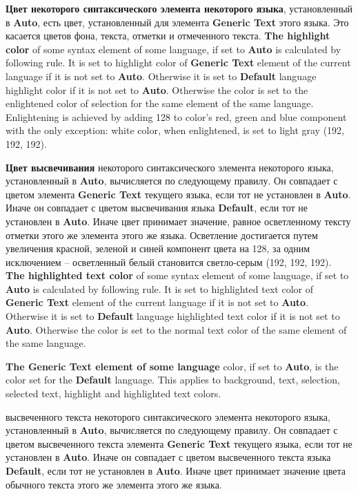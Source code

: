 {\bf Цвет некоторого синтаксического элемента некоторого языка}, установленный 
в {\bf Auto}, есть цвет, установленный для элемента {\bf Generic Text} этого 
языка. Это касается цветов фона, текста, отметки и отмеченного текста.
\fi
\ifenglish
{\bf The highlight color} of some syntax element of some language,
if set to {\bf Auto} is calculated by following rule. It is set to
highlight color of {\bf Generic Text} element of the current language if it is
not set to {\bf Auto}. Otherwise it is set to {\bf Default} language highlight
color if it is not set to {\bf Auto}. Otherwise the color is set to 
the enlightened color of selection for the same
element of the same language. Enlightening is achieved by adding 128 to
color's red, green and blue component with the only exception:
white color, when enlightened, is set to light gray (192, 192, 192).

\else
{\bf Цвет высвечивания} некоторого синтаксического элемента некоторого языка, 
установленный в {\bf Auto}, вычисляется по следующему правилу. Он совпадает с 
цветом элемента {\bf Generic Text} текущего языка, если тот не установлен в 
{\bf Auto}. Иначе он совпадает с цветом высвечивания языка {\bf Default}, если
тот не установлен в {\bf Auto}. Иначе цвет принимает значение, равное 
осветленному тексту отметки этого же элемента этого же языка. Осветление 
достигается путем увеличения красной, зеленой и синей компонент цвета на 128,
за одним исключением -- осветленный белый становится светло-серым (192, 192, 192).
\fi
\ifenglish
{\bf The highlighted text color} of some syntax element of some language,
if set to {\bf Auto} is calculated by following rule. It is set to
highlighted text color of {\bf Generic Text} element of the current language if it is
not set to {\bf Auto}. Otherwise it is set to {\bf Default} language highlighted text
color if it is not set to {\bf Auto}. Otherwise the color is set to
the normal text color of the same
element of the same language.

{\bf The Generic Text element of some language} color, if set to {\bf Auto},
is the color set for the {\bf Default} language.  This applies
to background, text, selection, selected text, highlight and highlighted text
colors.

\else
{ высвеченного текста} некоторого синтаксического элемента некоторого
языка, установленный в {\bf Auto}, вычисляется по следующему правилу. Он совпадает
с цветом высвеченного текста элемента {\bf Generic Text} текущего языка, если тот
не установлен в {\bf Auto}. Иначе он совпадает с цветом высвеченного текста языка
{\bf Default}, если тот не установлен в {\bf Auto}. Иначе цвет принимает значение
цвета обычного текста этого же элемента этого же языка.

